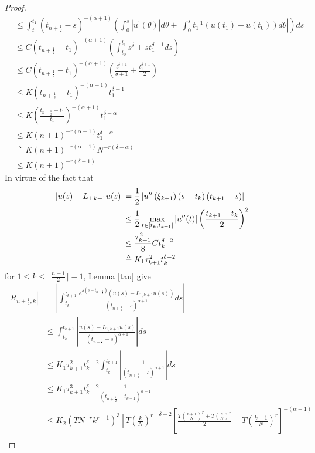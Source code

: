 \documentclass[10pt, reqno]{amsart}
\theoremstyle{remark}
\theoremstyle{definition}
\numberwithin{table}{section}
\begin{document}
\begin{proof}
\begin{equation}
\begin{aligned}
& \leq \int_{t_0}^{t_1}\left(t_{n+\frac{1}{2}}-s\right)^{-(\alpha+1)}\left(\int_0^s\left|u^{\prime}(\theta)\right| d \theta+\left|\int_0^s t_1^{-1}(u(t_1)-u(t_0)) d \theta\right|\right) d s \\
& \leq C\left(t_{n+\frac{1}{2}}-t_1\right)^{-(\alpha+1)}\left(\int_{t_0}^{t_1} s^\delta+s t_1^{\delta-1} d s\right) \\
& \leq C\left(t_{n+\frac{1}{2}}-t_1\right)^{-(\alpha+1)} (\frac{t_1^{\delta+1}}{\delta+1}+\frac{t_1^{\delta+1}}{2})\\
&\leq K\left(t_{n+\frac{1}{2}}-t_1\right)^{-(\alpha+1)}t_1^{\delta+1}\\
& \leq K\left(\frac{t_{n+\frac{1}{2}}-t_1}{t_1}\right)^{-(\alpha+1)}t_1^{\delta-\alpha} \\
& \leq K(n+1)^{-r(\alpha+1)}t_1^{\delta-\alpha}\\
&\triangleq{}K(n+1)^{-r(\alpha+1)}N^{-r(\delta-\alpha)}\\
&\leq K(n+1)^{-r(\delta+1)}
\end{aligned}
\end{equation}
In virtue of the fact that
\begin{align}
    \left| u(s)-L_{1,  k+1} u(s)\right|&=\frac{1}{2} \left|u^{\prime \prime}\left(\xi_{k+1}\right)\left(s-t_{k}\right)\left(t_{k+1}-s\right)\right|\notag\\
    &\leq \frac{1}{2}\max_{t \in\left[t_{k},  t_{k+1}\right]}|u''(t)|\left(\frac{t_{k+1}-t_k}{2}\right)^2\notag\\
    &\leq \frac{\tau_{k+1}^2}{8}Ct_k^{\delta-2}\notag\\
    &\triangleq{}K_1\tau_{k+1}^2t_k^{\delta-2} \label{e1}
\end{align}
for $1\leq k\leq \lceil \frac{n+1}{2}\rceil-1$, Lemma \ref{tau} give
    \begin{align*}
    |R_{n+\frac{1}{2}, k}| &= |\int_{t_k}^{t_{k+1}}\frac{e^{\lambda( s- t_{n+\frac{1}{2}})}(u(s)-L_{1, k+1}u(s))}{(t_{n+\frac{1}{2}}-s)^{\alpha+1}}ds|\\
    &\leq \int_{t_k}^{t_{k+1}}|\frac{u(s)-L_{1, k+1}u(s)}{(t_{n+\frac{1}{2}}-s)^{\alpha+1}}|ds \\
    &\leq K_1\tau_{k+1}^2t_k^{\delta-2}\int_{t_k}^{t_{k+1}}|\frac{1}{(t_{n+\frac{1}{2}}-s)^{\alpha+1}}|ds\\
    &\leq K_1\tau_{k+1}^3t_k^{\delta-2}\frac{1}{(t_{n+\frac{1}{2}}-t_{k+1})^{\alpha+1}}\\
    &\leq K_2(TN^{-r}k^{r-1})^3[T(\frac{k}{N})^r]^{\delta-2}[\frac{T(\frac{n+1}{N})^r+T(\frac{n}{N})^r}{2}-T(\frac{k+1}{N})^r]^{-(\alpha+1)}\\

\end{align*}
\end{proof}
\end{document}
